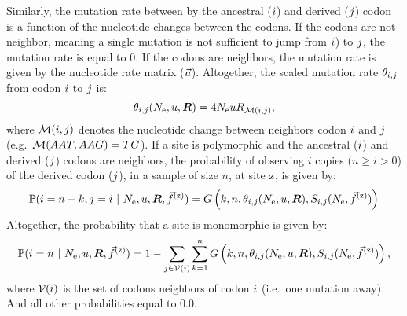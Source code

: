 Similarly, the mutation rate between by the ancestral (${i}$) and derived (${j}$) codon is a function of the nucleotide changes between the codons.
If the codons are not neighbor, meaning a single mutation is not sufficient to jump from ${i}$) to ${j}$, the mutation rate is equal to $0$.
If the codons are neighbors, the mutation rate is given by the nucleotide rate matrix ($\vec{u}$).
Altogether, the scaled mutation rate $\theta_{{i}, {j}}$ from codon ${i}$ to ${j}$ is:
\begin{equation}
	\theta_{{i}, {j}}(N_{\text{e}}, u, \bm{R}) = 4 N_{\text{e}} u R_{\mathcal{M}({i}, {j})},
\end{equation}
where $\mathcal{M}({i}, {j})$ denotes the nucleotide change between neighbors codon ${i}$ and ${j}$ (e.g.~$\mathcal{M}(AAT, AAG) = TG$).
If a site is polymorphic and the ancestral (${i}$) and derived (${j}$) codons are neighbors, the probability of observing $i$ copies ($n \geq i > 0$) of the derived codon (${j}$), in a sample of size $n$, at site $\text{z}$, is given by:
\begin{equation}
	\mathbb{P} ({i}=n-k,{j}=i \ |\ N_{\text{e}}, u, \bm{R}, \vec{f}^{(\text{z})}) = G\left(k, n, \theta_{{i}, {j}}(N_{\text{e}}, u, \bm{R}), S_{{i}, {j}}(N_{\text{e}}, \vec{f}^{(\text{z})}) \right)
\end{equation}
Altogether, the probability that a site is monomorphic is given by:
\begin{equation}
	\mathbb{P} ({i}= n \ |\ N_{\text{e}}, u, \bm{R}, \vec{f}^{(\text{z})}) = 1 - \sum\limits_{{j} \in \mathcal{V} ({i})} \sum\limits_{k=1}^{n} G\left(k, n, \theta_{{i}, {j}}(N_{\text{e}}, u, \bm{R}), S_{{i}, {j}}(N_{\text{e}}, \vec{f}^{(\text{z})})\right),
\end{equation}
where $ \mathcal{V} ({i})$ is the set of codons neighbors of codon ${i}$ (i.e.~one mutation away).
And all other probabilities equal to $0.0$.
